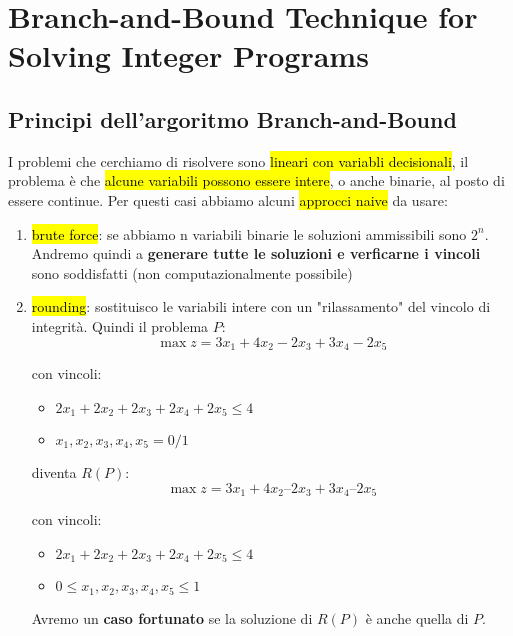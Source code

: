 \newpage
\section{Branch-and-Bound Technique for Solving Integer Programs}

\subsection{Principi dell'argoritmo Branch-and-Bound}

I problemi che cerchiamo di risolvere sono \hl{lineari con variabli decisionali}, il problema è che \hl{alcune variabili possono essere intere}, o anche binarie, al posto di essere continue. Per questi casi abbiamo alcuni \hl{approcci naive} da usare:

\begin{enumerate}
    \item \hl{brute force}: se abbiamo n variabili binarie le soluzioni ammissibili sono $2^n$. Andremo quindi a \textbf{generare tutte le soluzioni e verficarne i vincoli} sono soddisfatti (non computazionalmente possibile)
    \item \hl{rounding}: sostituisco le variabili intere con un "rilassamento" del vincolo di integrità. Quindi il problema \textbf{$P$}:
        $$\max z = 3x_1 + 4x_2 - 2x_3 + 3x_4 - 2x_5$$

        con vincoli:
        \begin{itemize}
            \item $2x_1 + 2x_2 + 2x_3 + 2x_4 + 2x_5 \leq 4$
            \item $x_1, x_2, x_3, x_4, x_5 = 0/1$
        \end{itemize}

        diventa \textbf{$R(P)$}:
        $$\max z = 3x_1 + 4x_2 – 2x_3 + 3x_4 – 2x_5$$
        
        con vincoli:
        \begin{itemize}
            \item $2x_1 + 2x_2 + 2x_3 + 2x_4 + 2x_5 \leq 4$
            \item $0 \leq x_1, x_2, x_3, x_4, x_5 \leq 1$
        \end{itemize}
        
        Avremo un \textbf{caso fortunato} se la soluzione di $R(P)$ è anche quella di $P$.

\end{enumerate}


